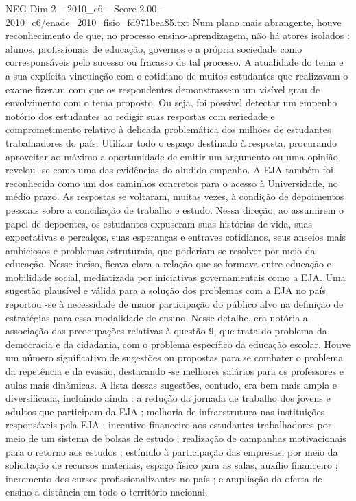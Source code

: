 \begin{textsample}{NEG Dim 2 – 2010\_c6 – Score 2.00 – 2010\_c6/enade\_2010\_fisio\_fd971bea85.txt}
Num plano mais abrangente, houve reconhecimento de que, no processo ensino-aprendizagem, não há atores isolados : alunos, profissionais de educação, governos e a própria sociedade como corresponsáveis pelo sucesso ou fracasso de tal processo.
A atualidade do tema e a sua explícita vinculação com o cotidiano de muitos estudantes que realizavam o exame fizeram com que os respondentes demonstrassem um visível grau de envolvimento com o tema proposto.
Ou seja, foi possível detectar um empenho notório dos estudantes ao redigir suas respostas com seriedade e comprometimento relativo à delicada problemática dos milhões de estudantes trabalhadores do país.
Utilizar todo o espaço destinado à resposta, procurando aproveitar ao máximo a oportunidade de emitir um argumento ou uma opinião revelou -se como uma das evidências do aludido empenho.
A EJA também foi reconhecida como um dos caminhos concretos para o acesso à Universidade, no médio prazo.
As respostas se voltaram, muitas vezes, à condição de depoimentos pessoais sobre a conciliação de trabalho e estudo.
Nessa direção, ao assumirem o papel de depoentes, os estudantes expuseram suas histórias de vida, suas expectativas e percalços, suas esperanças e entraves cotidianos, seus anseios mais ambiciosos e problemas estruturais, que poderiam se resolver por meio da educação.
Nesse inciso, ficava clara a relação que se formava entre educação e mobilidade social, mediatizada por iniciativas governamentais como a EJA.
Uma sugestão plausível e válida para a solução dos problemas com a EJA no país reportou -se à necessidade de maior participação do público alvo na definição de estratégias para essa modalidade de ensino.
Nesse detalhe, era notória a associação das preocupações relativas à questão 9, que trata do problema da democracia e da cidadania, com o problema específico da educação escolar.
Houve um número significativo de sugestões ou propostas para se combater o problema da repetência e da evasão, destacando -se melhores salários para os professores e aulas mais dinâmicas.
A lista dessas sugestões, contudo, era bem mais ampla e diversificada, incluindo ainda : a redução da jornada de trabalho dos jovens e adultos que participam da EJA ; melhoria de infraestrutura nas instituições responsáveis pela EJA ; incentivo financeiro aos estudantes trabalhadores por meio de um sistema de bolsas de estudo ; realização de campanhas motivacionais para o retorno aos estudos ; estímulo à participação das empresas, por meio da solicitação de recursos materiais, espaço físico para as salas, auxílio financeiro ; incremento dos cursos profissionalizantes no país ; e ampliação da oferta de ensino a distância em todo o território nacional.

\end{textsample}
